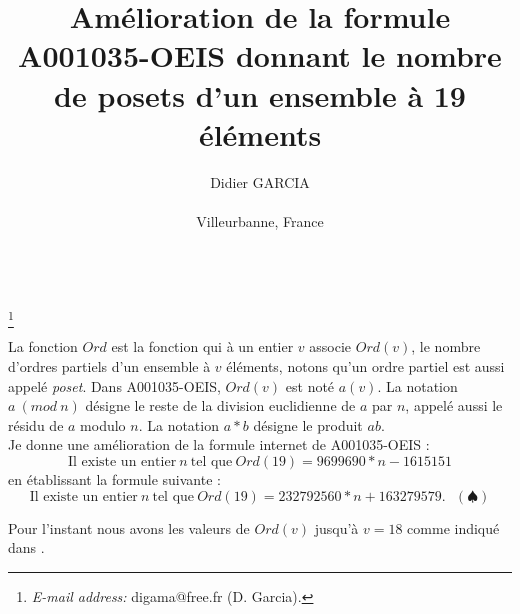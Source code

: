 \documentclass[12pt]{article}
\begin{document}
	
	
	
	
	
	
	
	
	\title{\bf{Am\'elioration de la formule A001035-OEIS  donnant le nombre de posets d'un ensemble \`a 19 \'el\'ements
}}
	\author{\small Didier GARCIA \\
		\centerline{  {\small Villeurbanne, France}}\\
	}
	\maketitle
	\footnote{
		{\it E-mail address:}
		 digama@free.fr (D. Garcia).
	}
	
	\vspace{-1.4cm}
	
%
%

 La fonction $Ord$ est  la fonction qui \`a un entier $v$ associe $Ord(v)$, le nombre
d'ordres partiels d'un ensemble à $v$ \'el\'ements, notons qu'un ordre partiel est aussi appel\'e {\it poset}. Dans A001035-OEIS,  $Ord(v)$ est not\'e $a(v)$. La notation $a \ (mod \ n)$ d\'esigne le reste de la division euclidienne de $a$ par $n$, appel\'e aussi le résidu de $a$ modulo $n$. La notation $a * b$ d\'esigne le produit $ab$.\\
Je donne une am\'elioration de la formule internet de A001035-OEIS :
    $$\mbox{Il existe un entier}\ n \ \mbox{tel que} \ Ord(19)  =9699690*n - 1615151$$    
  \noindent   en \'etablissant la formule suivante :  
$$\mbox{Il existe un entier}\ n \ \mbox{tel que}\ Ord(19) = 232792560*n + 163279579.\ \ \  (\spadesuit )$$



\noindent Pour l'instant nous avons les valeurs  de $Ord(v)$ jusqu'\`a  $v = 18$ comme indiqué dans \cite{sloane}.

 




\end{document}
